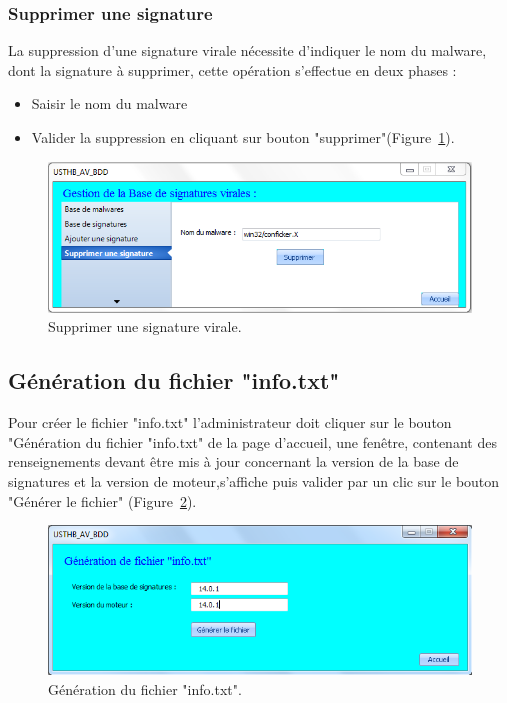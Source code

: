 \subsubsection{Supprimer  une signature}
La suppression d'une signature virale nécessite d'indiquer le nom du malware,
dont la signature à supprimer, cette opération s'effectue en deux phases :
\begin{itemize}

\item Saisir le nom du malware 
\item Valider la suppression en cliquant sur bouton "supprimer"(Figure~\ref{fig :im8}).

\end{itemize}
\begin{figure}[H]
\begin{center}
\includegraphics[scale=0.7]{Figures/im8.png}
\caption{Supprimer une signature virale.}
\label{fig :im8} 
\end{center}
\end{figure}
\subsection{Génération du fichier "info.txt"}
Pour créer le fichier "info.txt" l'administrateur doit cliquer sur le bouton "Génération du fichier "info.txt" de la page d'accueil, une fenêtre, contenant des renseignements devant être mis à jour concernant la version de la base de signatures et la version de moteur,s'affiche puis valider par un clic sur le bouton "Générer le fichier" (Figure~\ref{fig :im10}).
\begin{figure}[H]
\begin{center}
\includegraphics[scale=0.7]{Figures/im10.png}
\caption{Génération du fichier "info.txt".}
\label{fig :im10} 
\end{center}
\end{figure}
